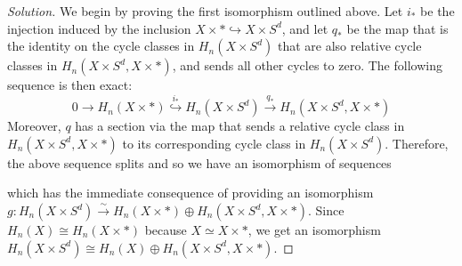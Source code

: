 \begin{proof}[Solution] We begin by proving the first isomorphism outlined above. Let $i_*$ be the injection induced by the inclusion $X\times * \hookrightarrow X \times S^d$, and let $q_*$ be the map that is the identity on the cycle classes in $H_n(X\times S^d)$ that are also relative cycle classes in $H_n(X\times S^d, X\times *)$, and sends all other cycles to zero. The following sequence is then exact:
\[
0 \to H_n(X\times *) \overset{i_*}{\hookrightarrow{}} H_n(X\times S^d) \overset{q_*}{\to} H_n(X\times S^d, X\times *)
\]
Moreover, $q$ has a section via the map that sends a relative cycle class in $H_n(X\times S^d, X\times *)$ to its corresponding cycle class in $H_n(X\times S^d)$. Therefore, the above sequence splits and so we have an isomorphism of sequences
\begin{center}
\end{center}
which has the immediate consequence of providing an isomorphism $ g: H_n(X\times S^d) \xrightarrow{\sim} H_n(X\times *) \oplus H_n(X\times S^{d}, X\times *) $. Since $H_n(X) \cong H_n(X\times *)$ because $X\simeq X \times *$, we get an isomorphism $H_n(X\times S^d) \cong H_n(X) \oplus H_n(X\times S^{d}, X\times *)$.



\end{proof}
